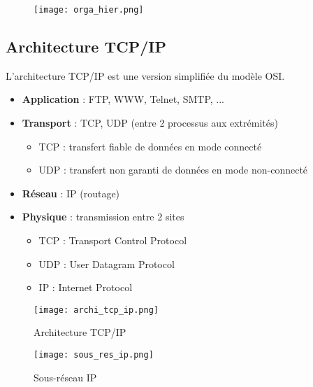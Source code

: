 \documentclass[journal, a4paper]{IEEEtran}
\begin{document}
	\begin{figure}[!hbt]
		\begin{center}
		\texttt{[image: orga\_hier.png]}
		\label{fig:orga_hier}
		\end{center}
	\end{figure}
	
	\subsection{Architecture TCP/IP}
	L'architecture TCP/IP est une version simplifiée du modèle OSI.
	\begin{itemize}
		\item \textbf{Application} : FTP, WWW, Telnet, SMTP, ...
		\item \textbf{Transport} : TCP, UDP (entre 2 processus aux extrémités)
		\begin{itemize}
			\item TCP : transfert fiable de données en mode connecté
			\item UDP : transfert non garanti de données en mode non-connecté
		\end{itemize}
		\item \textbf{Réseau} : IP (routage)
		\item \textbf{Physique} : transmission entre 2 sites
		\begin{itemize}
			\item TCP : Transport Control Protocol
			\item UDP : User Datagram Protocol
			\item IP : Internet Protocol
		\end{itemize}
 	\end{itemize}
	
	\begin{figure}[!hbt]
		\begin{center}
		\texttt{[image: archi\_tcp\_ip.png]}
		\caption{Architecture TCP/IP}
		\label{fig:archi_tcp_ip}
		\end{center}
	\end{figure}
	
	\begin{figure}[!hbt]
		\begin{center}
		\texttt{[image: sous\_res\_ip.png]}
		\caption{Sous-réseau IP}
		\label{fig:sous_res_ip}
		\end{center}
	\end{figure}
	
	\newpage
	
\end{document}
